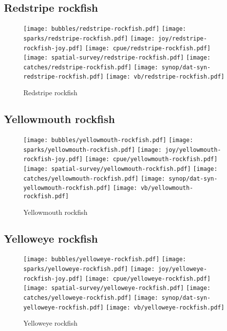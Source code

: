 \subsection*{Redstripe rockfish}

\begin{figure}[htbp]
\centering
\texttt{[image: bubbles/redstripe-rockfish.pdf]}
\texttt{[image: sparks/redstripe-rockfish.pdf]}
\texttt{[image: joy/redstripe-rockfish-joy.pdf]}
\texttt{[image: cpue/redstripe-rockfish.pdf]}
\texttt{[image: spatial-survey/redstripe-rockfish.pdf]}
\texttt{[image: catches/redstripe-rockfish.pdf]}
\texttt{[image: synop/dat-syn-redstripe-rockfish.pdf]}
\texttt{[image: vb/redstripe-rockfish.pdf]}
\caption{Redstripe rockfish}
\end{figure}
\clearpage
\subsection*{Yellowmouth rockfish}

\begin{figure}[htbp]
\centering
\texttt{[image: bubbles/yellowmouth-rockfish.pdf]}
\texttt{[image: sparks/yellowmouth-rockfish.pdf]}
\texttt{[image: joy/yellowmouth-rockfish-joy.pdf]}
\texttt{[image: cpue/yellowmouth-rockfish.pdf]}
\texttt{[image: spatial-survey/yellowmouth-rockfish.pdf]}
\texttt{[image: catches/yellowmouth-rockfish.pdf]}
\texttt{[image: synop/dat-syn-yellowmouth-rockfish.pdf]}
\texttt{[image: vb/yellowmouth-rockfish.pdf]}
\caption{Yellowmouth rockfish}
\end{figure}
\clearpage
\subsection*{Yelloweye rockfish}

\begin{figure}[htbp]
\centering
\texttt{[image: bubbles/yelloweye-rockfish.pdf]}
\texttt{[image: sparks/yelloweye-rockfish.pdf]}
\texttt{[image: joy/yelloweye-rockfish-joy.pdf]}
\texttt{[image: cpue/yelloweye-rockfish.pdf]}
\texttt{[image: spatial-survey/yelloweye-rockfish.pdf]}
\texttt{[image: catches/yelloweye-rockfish.pdf]}
\texttt{[image: synop/dat-syn-yelloweye-rockfish.pdf]}
\texttt{[image: vb/yelloweye-rockfish.pdf]}
\caption{Yelloweye rockfish}
\end{figure}
\clearpage
